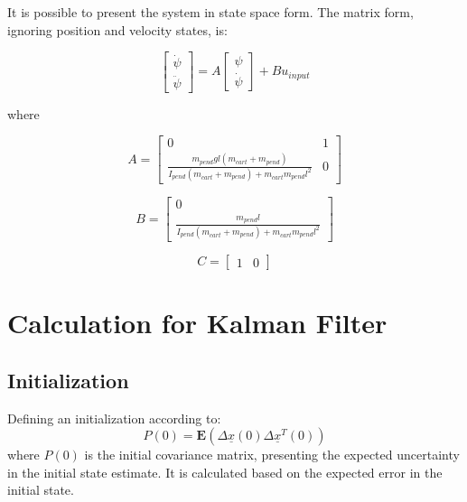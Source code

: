 \begin{appendices}
It is possible to present the system in state space form. The matrix form, ignoring position and velocity states, is:

\begin{equation}
	\begin{bmatrix}
		\dot{\psi} \\
		\ddot{\psi}
	\end{bmatrix} = A \begin{bmatrix}
		\psi \\
		\dot{\psi}
	\end{bmatrix} + B u_{input} \label{eq:reduced_state_space}
\end{equation}

where

\begin{equation}
	A = \begin{bmatrix}
		0 & 1 \\
		\frac{m_{pend} g l (m_{cart} + m_{pend})}{I_{pend} (m_{cart} + m_{pend}) + m_{cart} m_{pend} l^2} & 0
	\end{bmatrix} \label{eq:reduced_state_matrix_A}
\end{equation}

\begin{equation}
	B = \begin{bmatrix}
		0 \\
		\frac{m_{pend} l}{I_{pend} (m_{cart} + m_{pend}) + m_{cart} m_{pend} l^2}
	\end{bmatrix} \label{eq:reduced_state_matrix_B}
\end{equation}

\begin{equation}
	C = \begin{bmatrix}
		1 & 0
	\end{bmatrix} \label{eq:state_matrix_C}
\end{equation}



\section{Calculation for Kalman Filter} \label{appendix:B}
\subsection{Initialization}
Defining an initialization according to:
\begin{equation}
	P(0) = \mathbf{E}(\Delta\underline{x}(0) \Delta\underline{x}^T(0))  \label{eq:eq}
\end{equation}
where $P(0)$ is the initial covariance matrix, presenting the expected uncertainty in the initial state estimate. It is calculated based on the expected error in the initial state.



\end{appendices}
